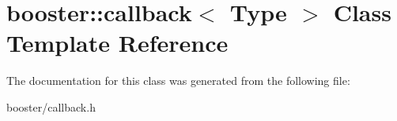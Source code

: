 \section{booster\-:\-:callback$<$ Type $>$ Class Template Reference}
\label{classbooster_1_1callback}


The documentation for this class was generated from the following file\-:\begin{DoxyCompactItemize}
\item 
booster/callback.\-h\end{DoxyCompactItemize}
